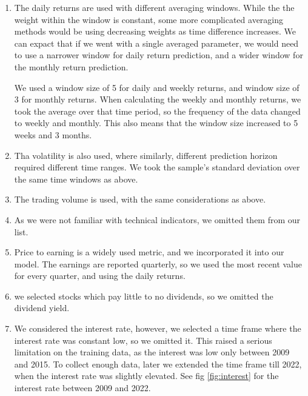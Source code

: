 \documentclass{article}
\begin{document}
\begin{enumerate}
    \item The daily returns are used with different
          averaging windows. While the the weight within the
          window is constant, some more complicated averaging
          methods would be using decreasing weights as time
          difference increases. We can expact that if we went
          with a single averaged parameter, we would need to use
          a narrower window for daily return prediction,
          and a wider window for the monthly return prediction.

          We used a window size of 5 for daily and weekly returns,
          and window size of 3 for monthly returns. When calculating
          the weekly and monthly returns, we took the average over
          that time period, so the frequency of the data changed
          to weekly and monthly. This also means that the window size
          increased to 5 weeks and 3 months.
    \item Tha volatility is also used, where similarly,
          different prediction horizon required different
          time ranges. We took the sample's standard deviation
          over the same time windows as above.
    \item The trading volume is used, with the same
          considerations as above.
    \item As we were not familiar with technical indicators,
          we omitted them from our list.
    \item Price to earning is a widely used metric,
          and we incorporated it into our model. The earnings
          are reported quarterly, so we used the most recent
          value for every quarter, and using the daily returns.
    \item we selected stocks which pay little to no dividends,
          so we omitted the dividend yield.
    \item We considered the interest rate, however,
          we selected a time frame where the interest rate
          was constant low, so we omitted it.
          This raised a serious limitation on the training
          data, as the interest was low only between 2009 and 2015.
          To collect enough data, later we extended the time frame
          till 2022, when the interest rate was slightly elevated.
          See fig \ref{fig:interest} for the interest rate
          between 2009 and 2022.

\end{enumerate}
\end{document}
